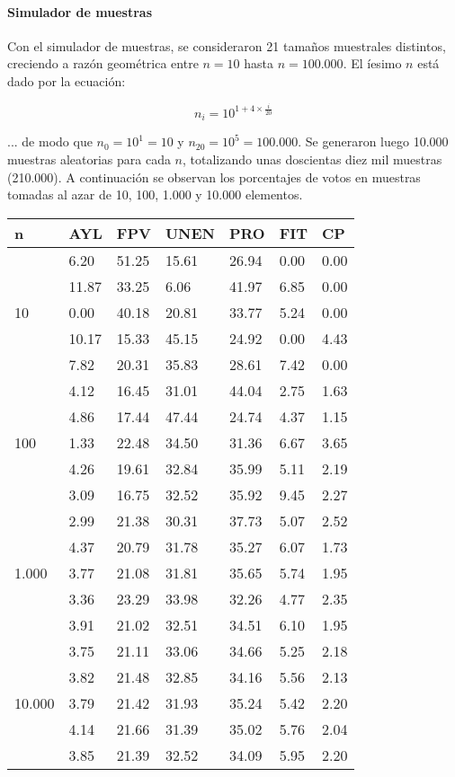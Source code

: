 \documentclass[12pt, a4paper]{article}
\begin{document}
\paragraph{Simulador de muestras}

Con el simulador de muestras, se consideraron 21 tama\~nos muestrales distintos, creciendo a raz\'on geom\'etrica entre $n=10$ hasta $n=100.000$. El \'iesimo $n$ est\'a dado por la ecuaci\'on:

$$ n_{i} = 10^{1 + 4 \times \frac{i}{20}} $$

... de modo que $n_{0}=10^{1}=10$ y $n_{20}=10^{5}=100.000$. Se generaron luego 10.000 muestras aleatorias para cada $n$, totalizando unas doscientas diez mil muestras (210.000). A continuaci\'on se observan los porcentajes de votos en muestras tomadas al azar de 10, 100, 1.000 y 10.000 elementos.

\begin{center}
	\begin{tabular}{l | llllll}
		n & AYL & FPV & UNEN & PRO & FIT & CP \\ \hline
\multirow{5}{*}{10} & 6.20 & 51.25 & 15.61 & 26.94 & 0.00 & 0.00 \\
& 11.87 & 33.25 & 6.06 & 41.97 & 6.85 & 0.00 \\
& 0.00 & 40.18 & 20.81 & 33.77 & 5.24 & 0.00 \\
& 10.17 & 15.33 & 45.15 & 24.92 & 0.00 & 4.43 \\
& 7.82 & 20.31 & 35.83 & 28.61 & 7.42 & 0.00 \\ \hline
\multirow{5}{*}{100} & 4.12 & 16.45 & 31.01 & 44.04 & 2.75 & 1.63 \\
& 4.86 & 17.44 & 47.44 & 24.74 & 4.37 & 1.15 \\
& 1.33 & 22.48 & 34.50 & 31.36 & 6.67 & 3.65 \\
& 4.26 & 19.61 & 32.84 & 35.99 & 5.11 & 2.19 \\
& 3.09 & 16.75 & 32.52 & 35.92 & 9.45 & 2.27 \\ \hline
\multirow{5}{*}{1.000} & 2.99 & 21.38 & 30.31 & 37.73 & 5.07 & 2.52 \\
& 4.37 & 20.79 & 31.78 & 35.27 & 6.07 & 1.73 \\
& 3.77 & 21.08 & 31.81 & 35.65 & 5.74 & 1.95 \\
& 3.36 & 23.29 & 33.98 & 32.26 & 4.77 & 2.35 \\ 
& 3.91 & 21.02 & 32.51 & 34.51 & 6.10 & 1.95 \\ \hline
\multirow{5}{*}{10.000} & 3.75 & 21.11 & 33.06 & 34.66 & 5.25 & 2.18 \\
& 3.82 & 21.48 & 32.85 & 34.16 & 5.56 & 2.13 \\
& 3.79 & 21.42 & 31.93 & 35.24 & 5.42 & 2.20 \\
& 4.14 & 21.66 & 31.39 & 35.02 & 5.76 & 2.04 \\
& 3.85 & 21.39 & 32.52 & 34.09 & 5.95 & 2.20 \\
	\end{tabular}
\end{center}
\end{document}
